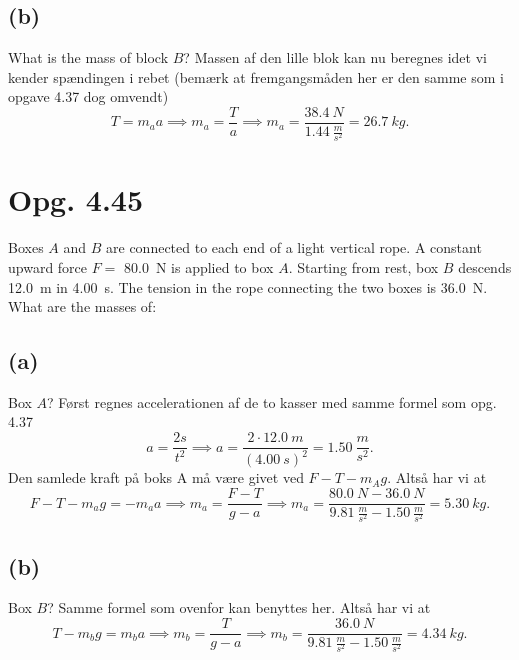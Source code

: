 \documentclass[12pt]{article}
\begin{document}
\subsection*{(b)}
What is the mass of block $B$?
\bigbreak
Massen af den lille blok kan nu beregnes idet vi kender spændingen i rebet (bemærk at fremgangsmåden her er den samme som i opgave 4.37 dog omvendt)
\[
T = m_a a \implies m_a = \frac{T}{a} \implies m_a = \frac{\qty{38,4}{N}}{\qty{1,44}{\frac{m}{s^2}}} = \qty{26,7}{kg} 
.\] 
  

\section*{Opg. 4.45}
Boxes $A$ and $B$ are connected to each end of a light vertical rope. A constant upward force $F =$  \qty{80,0}{N} is applied to box $A$. Starting from rest, box $B$ descends \qty{12,0}{m} in \qty{4,00}{s}. The tension in the rope connecting the two boxes is \qty{36,0}{N}. What are the masses of:


\subsection*{(a)}
Box $A$?
\bigbreak
Først regnes accelerationen af de to kasser med samme formel som opg. 4.37
\[
  a = \frac{2s}{t^2} \implies a = \frac{2\cdot \qty{12,0}{m}}{(\qty{4,00}{s})^2} = \qty{1,50}{\frac{m}{s^2}}
.\] 
Den samlede kraft på boks A må være givet ved $F-T-m_Ag$. Altså har vi at
 \[
   F-T-m_ag = -m_a a \implies m_a = \frac{F-T}{g-a} \implies m_a = \frac{\qty{80,0}{N}-\qty{36,0}{N}}{\qty{9,81}{\frac{m}{s^2}}-\qty{1,50}{\frac{m}{s^2}}} = \qty{5,30}{kg}
.\] 

 \subsection*{(b)}
Box $B$?
\bigbreak
Samme formel som ovenfor kan benyttes her. Altså har vi at
\[
T - m_b g = m_b a \implies m_b = \frac{T}{g-a} \implies m_b = \frac{\qty{36,0}{N}}{\qty{9,81}{\frac{m}{s^2}}-\qty{1,50}{\frac{m}{s^2}}} = \qty{4,34}{kg}
.\] 
\end{document}
